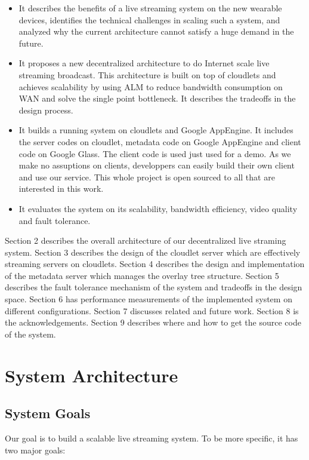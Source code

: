 \documentclass[letterpaper,twocolumn,10pt]{article}
\begin{document}
\begin{itemize}
  \item It describes the benefits of a live streaming system on the new wearable devices, identifies the technical challenges in scaling such a system, and analyzed why the current architecture cannot satisfy a huge demand in the future.
  \item It proposes a new decentralized architecture to do Internet scale live streaming broadcast. This architecture is built on top of cloudlets and achieves scalability by using ALM to reduce bandwidth consumption on WAN and solve the single point bottleneck. It describes the tradeoffs in the design process.
  \item It builds a running system on cloudlets and Google AppEngine. It includes the server codes on cloudlet, metadata code on Google AppEngine and client code on Google Glass. The client code is used just used for a demo. As we make no assuptions on clients, developpers can easily build their own client and use our service. This whole project is open sourced to all that are interested in this work.
  \item It evaluates the system on its scalability, bandwidth efficiency, video quality and fault tolerance.  
\end{itemize}

Section 2 describes the overall architecture of our decentralized live straming system. Section 3 describes the design of the cloudlet server which are effectively streaming servers on cloudlets. Section 4 describes the design and implementation of the metadata server which manages the overlay tree structure. Section 5 describes the fault tolerance mechanism of the system and tradeoffs in the design space. Section 6 has performance measurements of the implemented system on different configurations. Section 7 discusses related and future work. Section 8 is the acknowledgements. Section 9 describes where and how to get the source code of the system.

\section{System Architecture}

\subsection{System Goals}
Our goal is to build a scalable live streaming system. To be more specific, it has two major goals:
\end{document}
